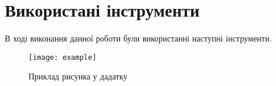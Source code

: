 \section{Використані інструменти}

В ході виконання данної роботи були використанні наступні інструменти.

\begin{figure}[h]
  \centering
  \texttt{[image: example]}
  \caption{\label{img:layout}Приклад рисунка у дадатку}
\end{figure}
